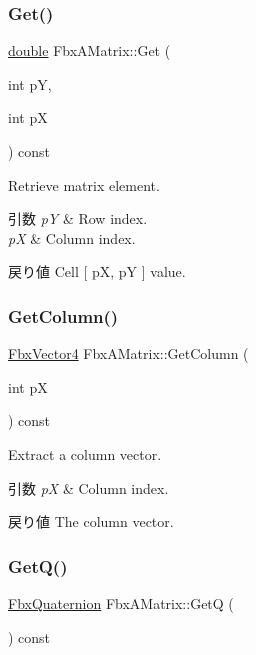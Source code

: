 \subsubsection{\texorpdfstring{Get()}{Get()}}
{\footnotesize\ttfamily \hyperlink{class_fbx_a_matrix_ad463edbb9fea344643297701f159faa7}{double} Fbx\+A\+Matrix\+::\+Get (\begin{DoxyParamCaption}\item[{int}]{pY,  }\item[{int}]{pX }\end{DoxyParamCaption}) const}

Retrieve matrix element. 
\begin{DoxyParams}{引数}
{\em pY} & Row index. \\
\hline
{\em pX} & Column index. \\
\hline
\end{DoxyParams}
\begin{DoxyReturn}{戻り値}
Cell \mbox{[} pX, pY \mbox{]} value. 
\end{DoxyReturn}
\mbox{\label{class_fbx_a_matrix_a73d4fbefc0fa5888553d3e7e0784e971}} 
\subsubsection{\texorpdfstring{Get\+Column()}{GetColumn()}}
{\footnotesize\ttfamily \hyperlink{class_fbx_vector4}{Fbx\+Vector4} Fbx\+A\+Matrix\+::\+Get\+Column (\begin{DoxyParamCaption}\item[{int}]{pX }\end{DoxyParamCaption}) const}

Extract a column vector. 
\begin{DoxyParams}{引数}
{\em pX} & Column index. \\
\hline
\end{DoxyParams}
\begin{DoxyReturn}{戻り値}
The column vector. 
\end{DoxyReturn}
\mbox{\label{class_fbx_a_matrix_ad65916a52b30b14175213b24111e845b}} 
\subsubsection{\texorpdfstring{Get\+Q()}{GetQ()}}
{\footnotesize\ttfamily \hyperlink{class_fbx_quaternion}{Fbx\+Quaternion} Fbx\+A\+Matrix\+::\+GetQ (\begin{DoxyParamCaption}{ }\end{DoxyParamCaption}) const}

